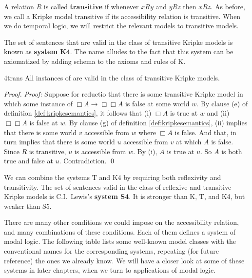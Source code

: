 A relation $R$ is called \textbf{transitive} if whenever $xRy$ and $yRz$ then
$xRz$. As before, we call a Kripke model transitive if its accessibility
relation is transitive. When we do temporal logic, we will restrict the relevant
models to transitive models.

The set of sentences that are valid in the class of transitive Kripke models is
known as \textbf{system K4}. The name alludes to the fact that this system can
be axiomatized by adding schema  to the axioms and rules of K.

\begin{observation}{4trans}
  All instances of  are valid in the class of transitive Kripke models.
\end{observation}
%
\begin{proof}
  \emph{Proof:} Suppose for reductio that there is some transitive Kripke model
  in which some instance of $\Box A \to \Box \Box A$ is false at some world $w$.
  By clause (e) of definition \ref{def:kripkesemantics}, it follows that (i)
  $\Box A$ is true at $w$ and (ii) $\Box\Box A$ is false at $w$. By clause (g)
  of definition \ref{def:kripkesemantics}, (ii) implies that there is some world
  $v$ accessible from $w$ where $\Box A$ is false. And that, in turn implies
  that there is some world $u$ accessible from $v$ at which $A$ is false. Since
  $R$ is transitive, $u$ is accessible from $w$. By (i), $A$ is true at $u$. So
  $A$ is both true and false at $u$. Contradiction. \qed
\end{proof}

We can combine the systems T and K4 by requiring both reflexivity and
transitivity. The set of sentences valid in the class of reflexive and
transitive Kripke models is C.I.\ Lewis's \textbf{system S4}. It is stronger
than K, T, and K4, but weaker than S5.

There are many other conditions we could impose on the accessibility relation,
and many combinations of these conditions. Each of them defines a system of
modal logic. The following table lists some well-known model classes with the
conventional names for the corresponding systems, repeating (for future
reference) the ones we already know. We will have a closer look at some of these
systems in later chapters, when we turn to applications of modal logic.

